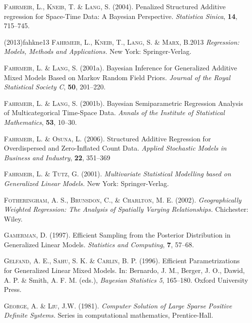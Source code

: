 \documentclass[11pt,a4paper,twoside]{bayesxarticle}
\begin{document}
\begin{thebibliography}{99}
 {\scshape Fahrmeir, L., Kneib, T. \& Lang, S.} (2004).
 Penalized Structured Additive regression for Space-Time Data: A Bayesian Perspective.
 {\it Statistica Sinica}, {\bf 14}, 715--745.

(2013){fahkne13}
{\scshape Fahrmeir, L.,  Kneib, T., Lang, S. \& Marx, B.}{2013}
{\it Regression: Models, Methods and Applications.}
 New York: Springer-Verlag.


 {\scshape Fahrmeir, L. \& Lang, S.} (2001a).
 Bayesian Inference for Generalized Additive Mixed Models Based on Markov Random Field Priors.
 {\it Journal of the Royal Statistical Society C}, {\bf 50}, 201--220.

 {\scshape Fahrmeir, L. \& Lang, S.} (2001b).
 Bayesian Semiparametric Regression Analysis of Multicategorical Time-Space Data.
 {\it Annals of the Institute of Statistical Mathematics}, {\bf 53}, 10--30.

 {\scshape Fahrmeir, L. \& Osuna, L.} (2006).
 Structured Additive Regression for Overdispersed and Zero-Inflated Count Data.
 {\it Applied Stochastic Models in Business and Industry}, {\bf 22}, 351--369

 {\scshape Fahrmeir, L. \& Tutz, G.} (2001).
 {\it Multivariate Statistical Modelling based on Generalized Linear Models.}
 New York: Springer-Verlag.

 {\scshape Fotheringham, A. S., Brunsdon, C., \& Charlton, M. E.} (2002).
 {\it Geographically Weighted Regression: The Analysis of Spatially Varying Relationships.}
 Chichester: Wiley.

 {\scshape Gamerman, D.} (1997).
 Efficient Sampling from the Posterior Distribution in Generalized Linear Models.
 {\it Statistics and Computing}, {\bf 7}, 57--68.

 {\scshape Gelfand, A. E., Sahu, S. K. \& Carlin, B. P.} (1996).
 Efficient Parametrizations for Genera\-lized Linear Mixed Models.
 In: Bernardo, J. M., Berger, J. O., Dawid, A. P. \& Smith, A. F. M. (eds.),
 {\it Bayesian Statistics 5}, 165--180.
 Oxford University Press.

 {\scshape George, A. \& Liu, J.W.} (1981).
 {\it Computer Solution of Large Sparse Positive Definite Systems.}
 Series in computational mathematics, Prentice-Hall.


\end{thebibliography}
\end{document}
